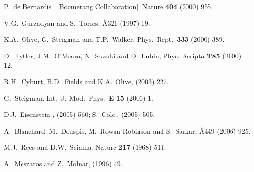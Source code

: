 \documentclass[12pt]{iopart}
\begin{document}
\begin{thebibliography}{66}
P.~de Bernardis \etal\ [Boomerang Collaboration],
Nature {\bf 404} (2000) 955. %

V.G.~Gurzadyan and S.~Torres,
\AA{321} (1997) 19. %

K.A.~Olive, G.~Steigman and T.P.~Walker,
Phys.\ Rept.\ {\bf 333} (2000) 389. %

D.~Tytler, J.M.~O'Meara, N.~Suzuki and D.~Lubin,
Phys.\ Scripta {\bf T85} (2000) 12. %

R.H.~Cyburt, B.D.~Fields and K.A.~Olive,
 (2003) 227. %

G.~Steigman,
Int.\ J.\ Mod.\ Phys.\ {\bf E 15} (2006) 1. %

D.J.~Eisenstein \etal,
 (2005) 560; %
S.~Cole \etal,
 (2005) 505. %

A.~Blanchard, M.~Douspis, M.~Rowan-Robinson and S.~Sarkar,
\AA{449} (2006) 925. %

M.J.~Rees and D.W.~Sciama,
Nature {\bf217} (1968) 511.

A.~Meszaros and Z.~Molnar,
 (1996) 49.


\end{thebibliography}
\end{document}
